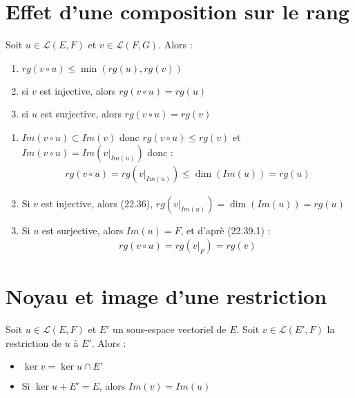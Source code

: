 \documentclass[../main.tex]{subfiles}
\begin{document}
\section{Effet d'une composition sur le rang}
\begin{tcolorbox}[title=Théorème 22.39, title filled=false, colframe=orange, colback=orange!10!white]
    Soit $u \in \mathcal{L}(E, F)$ et $v \in \mathcal{L}(F, G)$. Alors :
    \begin{enumerate}
        \item $rg(v\circ u) \leq \min(rg(u), rg(v))$
        \item si $v$ est injective, alors $rg(v\circ u) = rg(u)$
        \item si $u$ est surjective, alors $rg(v\circ u) = rg(v)$
    \end{enumerate}
\end{tcolorbox}

\begin{enumerate}
    \item $Im(v\circ u) \subset Im(v)$ donc $rg(v\circ u) \leq rg(v)$ et $Im(v\circ u) = Im(\left. v \right|_{Im(u)})$ donc : 
    \begin{align*}
        rg(v\circ u) = rg(\left. v \right|_{Im(u)}) \leq \dim(Im(u)) = rg(u)
    \end{align*}

    \item Si $v$ est injective, alors (22.36), $rg(\left. v \right|_{Im(u)}) = \dim(Im(u)) = rg(u)$
    \item Si $u$ est surjective, alors $Im(u) = F$, et d'aprè (22.39.1) : 
    \begin{align*}
        rg(v\circ u) = rg(\left. v \right|_F) = rg(v)
    \end{align*}
\end{enumerate}

\section{Noyau et image d'une restriction}
\begin{tcolorbox}[title=Lemme 22.40, title filled=false, colframe=orange, colback=orange!10!white]
    Soit $u\in \mathcal{L}(E, F)$ et $E'$ un sous-espace vectoriel de $E$. Soit $v\in \mathcal{L}(E', F)$ la restriction de $u$ à $E'$. Alors :
    \begin{itemize}
        \item $\ker v = \ker u \cap E'$
        \item Si $\ker u + E' = E$, alors $Im(v) = Im(u)$
    \end{itemize}
\end{tcolorbox}
\end{document}
